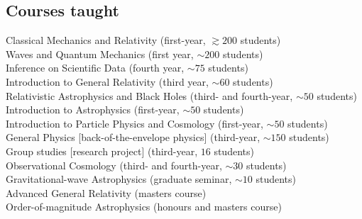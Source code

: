 \documentclass[margin,line]{res}
\begin{document}
\begin{resume}
\section{\sc Courses taught}
Classical Mechanics and Relativity (first-year, $\gtrsim 200$ students)\\
Waves and Quantum Mechanics (first year, $\sim 200$ students)\\
Inference on Scientific Data (fourth year, $\sim 75$ students)\\
Introduction to General Relativity (third year, $\sim 60$ students)\\
Relativistic Astrophysics and Black Holes (third- and fourth-year, $\sim 50$ students)\\
Introduction to Astrophysics (first-year, $\sim 50$ students)\\ 
Introduction to Particle Physics and Cosmology (first-year, $\sim 50$ students)\\ 
General Physics [back-of-the-envelope physics] (third-year, $\sim 150$ students)\\
Group studies [research project] (third-year, $16$ students)\\
Observational Cosmology (third- and fourth-year, $\sim 30$ students)\\
Gravitational-wave Astrophysics (graduate seminar, $\sim 10$ students)\\
Advanced General Relativity (masters course)\\
Order-of-magnitude Astrophysics (honours and masters course)\\




\end{resume}
\end{document}

